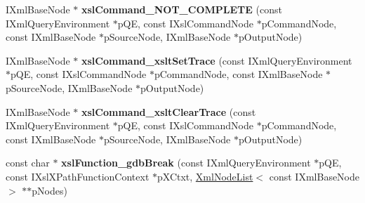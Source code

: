 \begin{DoxyCompactItemize}
\item 
\hypertarget{group__XSLModule-Commands_gaa0c167a84041909ba1dc988540ff7d8e}{\-I\-Xml\-Base\-Node $\ast$ {\bfseries xsl\-Command\-\_\-\-N\-O\-T\-\_\-\-C\-O\-M\-P\-L\-E\-T\-E} (const \-I\-Xml\-Query\-Environment $\ast$p\-Q\-E, const \-I\-Xsl\-Command\-Node $\ast$p\-Command\-Node, const \-I\-Xml\-Base\-Node $\ast$p\-Source\-Node, \-I\-Xml\-Base\-Node $\ast$p\-Output\-Node)}\label{group__XSLModule-Commands_gaa0c167a84041909ba1dc988540ff7d8e}

\item 
\hypertarget{group__XSLModule-Commands_ga15bc1ae75d76acc84908a51a4df8300a}{\-I\-Xml\-Base\-Node $\ast$ {\bfseries xsl\-Command\-\_\-xslt\-Set\-Trace} (const \-I\-Xml\-Query\-Environment $\ast$p\-Q\-E, const \-I\-Xsl\-Command\-Node $\ast$p\-Command\-Node, const \-I\-Xml\-Base\-Node $\ast$p\-Source\-Node, \-I\-Xml\-Base\-Node $\ast$p\-Output\-Node)}\label{group__XSLModule-Commands_ga15bc1ae75d76acc84908a51a4df8300a}

\item 
\hypertarget{group__XSLModule-Commands_ga1a2267db41d4f903417dfac6443eb683}{\-I\-Xml\-Base\-Node $\ast$ {\bfseries xsl\-Command\-\_\-xslt\-Clear\-Trace} (const \-I\-Xml\-Query\-Environment $\ast$p\-Q\-E, const \-I\-Xsl\-Command\-Node $\ast$p\-Command\-Node, const \-I\-Xml\-Base\-Node $\ast$p\-Source\-Node, \-I\-Xml\-Base\-Node $\ast$p\-Output\-Node)}\label{group__XSLModule-Commands_ga1a2267db41d4f903417dfac6443eb683}

\item 
\hypertarget{group__XSLModule-Functions_ga94f9bcb82655217ac57900eac1501907}{const char $\ast$ {\bfseries xsl\-Function\-\_\-gdb\-Break} (const \-I\-Xml\-Query\-Environment $\ast$p\-Q\-E, const \-I\-Xsl\-X\-Path\-Function\-Context $\ast$p\-X\-Ctxt, \hyperlink{classgeneral__server_1_1XmlNodeList}{\-Xml\-Node\-List}$<$ const \-I\-Xml\-Base\-Node $>$ $\ast$$\ast$p\-Nodes)}\label{group__XSLModule-Functions_ga94f9bcb82655217ac57900eac1501907}

\end{DoxyCompactItemize}
